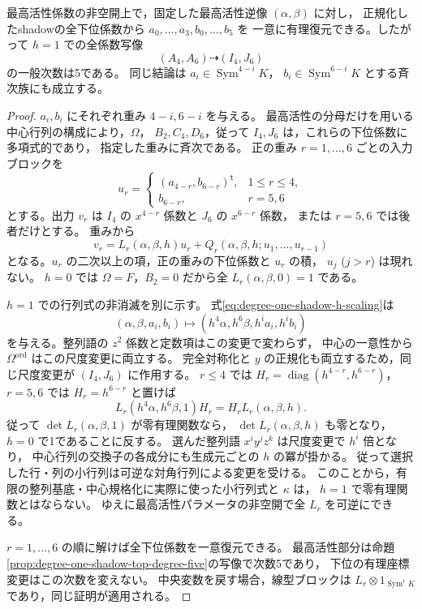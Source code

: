 \begin{proposition}[次数1の全下位係数の三角復元]
\label{prop:degree-one-shadow-lower-triangular}
最高活性係数の非空開上で，固定した最高活性逆像 $(\alpha,\beta)$ に対し，
正規化したshadowの全下位係数から $a_0,\ldots,a_3,b_0,\ldots,b_5$ を
一意に有理復元できる。したがって $h=1$ での全係数写像
\[
 (A_4,A_6)\dashrightarrow(I_4,J_6)
\]
の一般次数は5である。
同じ結論は $a_i\in\operatorname{Sym}^{4-i}K$，
$b_i\in\operatorname{Sym}^{6-i}K$ とする斉次族にも成立する。
\end{proposition}
\begin{proof}
$a_i,b_i$ にそれぞれ重み $4-i,6-i$ を与える。
最高活性の分母だけを用いる中心行列の構成により，$\Omega$，
$B_2,C_4,D_6$，従って $I_4,J_6$ は，これらの下位係数に多項式的であり，
指定した重みに斉次である。
正の重み $r=1,\ldots,6$ ごとの入力ブロックを
\[
 u_r=
 \begin{cases}(a_{4-r},b_{6-r})^{\mathsf t},&1\le r\le4,\\
 b_{6-r},&r=5,6
 \end{cases}
\]
とする。出力 $v_r$ は $I_4$ の $x^{4-r}$ 係数と $J_6$ の $x^{6-r}$ 係数，
または $r=5,6$ では後者だけとする。
重みから
\[
 v_r=L_r(\alpha,\beta,h)u_r+
             Q_r(\alpha,\beta,h;u_1,\ldots,u_{r-1})
\]
となる。$u_r$ の二次以上の項，正の重みの下位係数と $u_r$ の積，
$u_j$ ($j>r$) は現れない。
$h=0$ では $\Omega=F$，$B_2=0$ だから全 $L_r(\alpha,\beta,0)=1$ である。

$h=1$ での行列式の非消滅を別に示す。
式\eqref{eq:degree-one-shadow-h-scaling}は
\[
 (\alpha,\beta,a_i,b_i)\mapsto
    (h^4\alpha,h^6\beta,h^i a_i,h^i b_i)
\]
を与える。整列語の $z^2$ 係数と定数項はこの変更で変わらず，
中心の一意性から $\Omega^{\mathrm{ord}}$ はこの尺度変更に両立する。
完全対称化と $y$ の正規化も両立するため，同じ尺度変更が $(I_4,J_6)$ に作用する。
$r\le4$ では $H_r=\operatorname{diag}(h^{4-r},h^{6-r})$，
$r=5,6$ では $H_r=h^{6-r}$ と置けば
\[
 L_r(h^4\alpha,h^6\beta,1)H_r
       =H_rL_r(\alpha,\beta,h).
\]
従って $\det L_r(\alpha,\beta,1)$ が零有理関数なら，
$\det L_r(\alpha,\beta,h)$ も零となり，$h=0$ で1であることに反する。
選んだ整列語 $x^iy^jz^k$ は尺度変更で $h^i$ 倍となり，
中心行列の交換子の各成分にも生成元ごとの $h$ の冪が掛かる。
従って選択した行・列の小行列は可逆な対角行列による変更を受ける。
このことから，有限の整列基底・中心規格化に実際に使った小行列式と $\kappa$ は，
$h=1$ で零有理関数とはならない。
ゆえに最高活性パラメータの非空開で全 $L_r$ を可逆にできる。

$r=1,\ldots,6$ の順に解けば全下位係数を一意復元できる。
最高活性部分は命題\ref{prop:degree-one-shadow-top-degree-five}の写像で次数5であり，
下位の有理座標変更はこの次数を変えない。
中央変数を戻す場合，線型ブロックは
$L_r\otimes1_{\operatorname{Sym}^rK}$ であり，同じ証明が適用される。
\end{proof}

